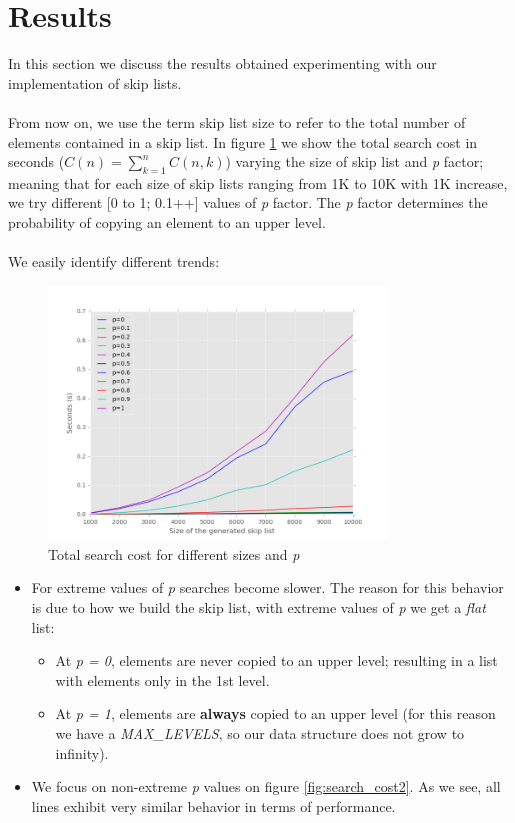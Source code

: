 \documentclass{article}
\begin{document}
\section{Results} \label{sec:results}
In this section we discuss the results obtained experimenting with our implementation of skip lists.\\
\\
From now on, we use the term skip list size to refer to the total number of elements contained in a skip list. In figure \ref{fig:search_cost} we show the total search cost in seconds ($C(n) = \sum_{k=1}^{n}C(n,k)$) varying the size of skip list and \textit{p} factor; meaning that for each size of skip lists ranging from 1K to 10K with 1K increase,  we try different [0 to 1; 0.1++] values of \textit{p} factor. The \textit{p} factor determines the probability of copying an element to an upper level.
\\
\\
We easily identify different trends: 

\begin{figure}[H]
  \begin{center}
    \includegraphics[width=0.8\textwidth]{imgs/time.png}
    \caption{Total search cost for different sizes and \textit{p}}
    \label{fig:search_cost}
  \end{center}
\end{figure}


\begin{itemize}
    \item For extreme values of \textit{p} searches become slower. The reason for this behavior is due to how we build the skip list, with extreme values of \textit{p} we get a \textit{flat} list:
    \begin{itemize}
        \item At \textit{p = 0},  elements are never copied to an upper level; resulting in a list with elements only in the 1st level.
        \item At \textit{p = 1}, elements are \textbf{always} copied to an upper level (for this reason we have a \textit{MAX\_LEVELS}, so our data structure does not grow to infinity).
    \end{itemize}
    \item We focus on non-extreme \textit{p} values on figure \ref{fig:search_cost2}. As we see, all lines exhibit very similar behavior in terms of performance.
\end{itemize}
\end{document}

